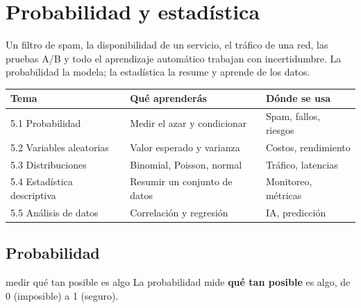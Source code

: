 \chapter{Probabilidad y estad\'istica}
\label{cap:probabilidad}

\begin{tmsistemas}
Un filtro de spam, la disponibilidad de un servicio, el tr\'afico de una red, las pruebas A/B y todo el aprendizaje autom\'atico trabajan con incertidumbre. La probabilidad la modela; la estad\'istica la resume y aprende de los datos.
\end{tmsistemas}

\begin{center}
\begin{tabular}{|p{3.6cm}|p{5.2cm}|p{4.0cm}|}
\hline
\rowcolor{tmAzulClaro}\textbf{Tema} & \textbf{Qu\'e aprender\'as} & \textbf{D\'onde se usa}\\ \hline
5.1 Probabilidad & Medir el azar y condicionar & Spam, fallos, riesgos\\ \hline
5.2 Variables aleatorias & Valor esperado y varianza & Costos, rendimiento\\ \hline
5.3 Distribuciones & Binomial, Poisson, normal & Tr\'afico, latencias\\ \hline
5.4 Estad\'istica descriptiva & Resumir un conjunto de datos & Monitoreo, m\'etricas\\ \hline
5.5 An\'alisis de datos & Correlaci\'on y regresi\'on & IA, predicci\'on\\ \hline
\end{tabular}
\end{center}


\section{Probabilidad}
\label{sec:5-1}

\begin{tmconcepto}{medir qu\'e tan posible es algo}
La probabilidad mide \textbf{qu\'e tan posible} es algo, de 0 (imposible) a 1 (seguro).
\end{tmconcepto}

